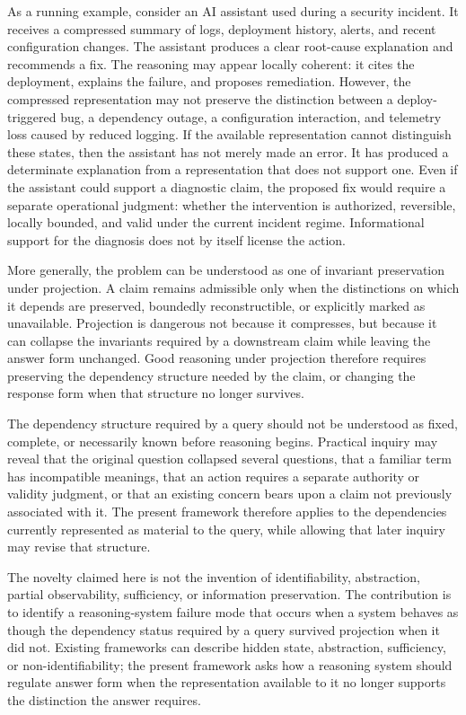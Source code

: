 \documentclass[11pt]{article}
\begin{document}
As a running example, consider an AI assistant used during a security incident. It receives a compressed summary of logs, deployment history, alerts, and recent configuration changes. The assistant produces a clear root-cause explanation and recommends a fix. The reasoning may appear locally coherent: it cites the deployment, explains the failure, and proposes remediation. However, the compressed representation may not preserve the distinction between a deploy-triggered bug, a dependency outage, a configuration interaction, and telemetry loss caused by reduced logging. If the available representation cannot distinguish these states, then the assistant has not merely made an error. It has produced a determinate explanation from a representation that does not support one. Even if the assistant could support a diagnostic claim, the proposed fix would require a separate operational judgment: whether the intervention is authorized, reversible, locally bounded, and valid under the current incident regime. Informational support for the diagnosis does not by itself license the action.

More generally, the problem can be understood as one of invariant preservation under projection. A claim remains admissible only when the distinctions on which it depends are preserved, boundedly reconstructible, or explicitly marked as unavailable. Projection is dangerous not because it compresses, but because it can collapse the invariants required by a downstream claim while leaving the answer form unchanged. Good reasoning under projection therefore requires preserving the dependency structure needed by the claim, or changing the response form when that structure no longer survives.

The dependency structure required by a query should not be understood as fixed, complete, or necessarily known before reasoning begins. Practical inquiry may reveal that the original question collapsed several questions, that a familiar term has incompatible meanings, that an action requires a separate authority or validity judgment, or that an existing concern bears upon a claim not previously associated with it. The present framework therefore applies to the dependencies currently represented as material to the query, while allowing that later inquiry may revise that structure.

The novelty claimed here is not the invention of identifiability, abstraction, partial observability, sufficiency, or information preservation. The contribution is to identify a reasoning-system failure mode that occurs when a system behaves as though the dependency status required by a query survived projection when it did not. Existing frameworks can describe hidden state, abstraction, sufficiency, or non-identifiability; the present framework asks how a reasoning system should regulate answer form when the representation available to it no longer supports the distinction the answer requires.
\end{document}
